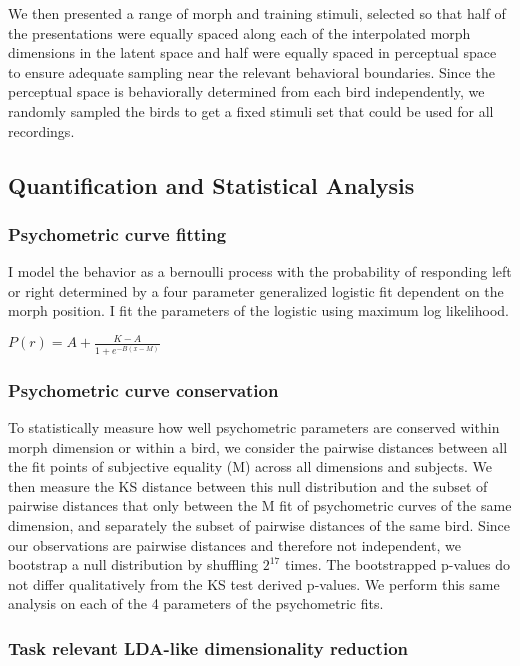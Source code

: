 We then presented a range of morph and training stimuli, selected so that half of the presentations were equally spaced along each of the interpolated morph dimensions in the latent space and half were equally spaced in perceptual space to ensure adequate sampling near the relevant behavioral boundaries. Since the perceptual space is behaviorally determined from each bird independently, we randomly sampled the birds to get a fixed stimuli set that could be used for all recordings.


\subsection{Quantification and Statistical Analysis}

\subsubsection{Psychometric curve fitting}
I model the behavior as a bernoulli process with the probability of responding left or right determined by a four parameter generalized logistic fit dependent on the morph position. I fit the parameters of the logistic using maximum log likelihood.

$P(r) = A + \frac{K - A}{1 + e^{-B(x-M)}}$

\subsubsection{Psychometric curve conservation}
To statistically measure how well psychometric parameters are conserved within morph dimension or within a bird, we consider the pairwise distances between all the fit points of subjective equality (M) across all dimensions and subjects. We then measure the \ac{KS} distance between this null distribution and the subset of pairwise distances that only between the M fit of psychometric curves of the same dimension, and separately the subset of pairwise distances of the same bird. Since our observations are pairwise distances and therefore not independent, we bootstrap a null distribution by shuffling $2^{17}$ times. The bootstrapped p-values do not differ qualitatively from the KS test derived p-values. We perform this same analysis on each of the 4 parameters of the psychometric fits.

\subsubsection{Task relevant LDA-like dimensionality reduction}

